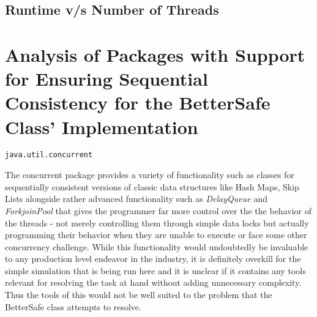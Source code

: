 \subsection{Runtime v/s Number of Threads}
\begin{table}[!htbp]
\centering
{}
\end{table}
\section{Analysis of Packages with Support for Ensuring Sequential Consistency for the BetterSafe Class' Implementation}

\begin{verbatim}
java.util.concurrent
\end{verbatim}
The concurrent package provides a variety of functionality such as classes for sequentially consistent versions of classic data structures like Hash Maps, Skip Lists alongside rather advanced functionality such as \emph{DelayQueue} and \emph{ForkjoinPool} that gives the programmer far more control over the the behavior of the threads - not merely controlling them through simple data locks but actually programming their behavior when they are unable to execute or face some other concurrency challenge.
While this functionality would undoubtedly be invaluable to any production level endeavor in the industry, it is definitely overkill for the simple simulation that is being run here and it is unclear if it contains any tools relevant for resolving the task at hand without adding unnecessary complexity. Thus the tools of this would not be well suited to the problem that the BetterSafe class attempts to resolve. 

